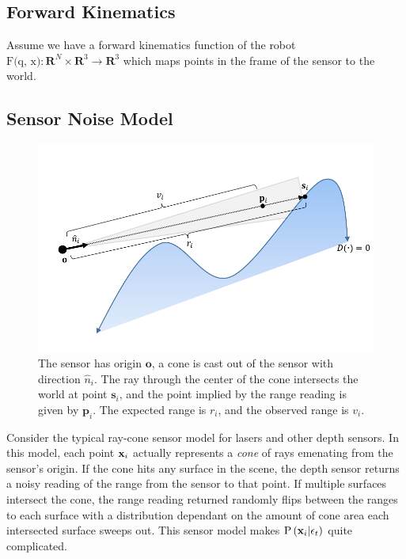 \documentclass{article}
\begin{document}
\subsection{Forward Kinematics}

Assume we have a forward kinematics function of the robot $\text{F(q, x)} : \mathbf{R}^N \times \mathbf{R}^3 \to \mathbf{R}^3$ which maps points in the frame of the sensor to the world.

\subsection{Sensor Noise Model}

\begin{figure}
	\centering
	\includegraphics[width=1.0\textwidth]{img/raycone.pdf}
	\caption{The sensor has origin $\mathbf{o}$, a cone is cast out of the sensor with direction $\hat{n}_i$. The ray through the center of the cone intersects the world at point $\mathbf{s}_i$, and the point implied by the range reading is given by
	$\mathbf{p}_i$. The expected range is $r_i$, and the observed range is $v_i$.} 
	\label{fig:ray_cone} 
\end{figure}

Consider the typical ray-cone sensor model for lasers and other depth sensors. In this model, each point $\mathbf{x}_i$ actually represents a \textit{cone} of rays emenating from the sensor's origin. If the cone hits any surface in the scene, the depth
sensor returns a noisy reading of the range from the sensor to that point. If multiple surfaces intersect the cone, the range reading returned randomly flips between the ranges to each surface with a distribution dependant on the amount of cone area
each intersected surface sweeps out. This sensor model makes $\text{P}\left(\mathbf{x}_i | \epsilon_t\right)$ quite complicated. 
\end{document}
